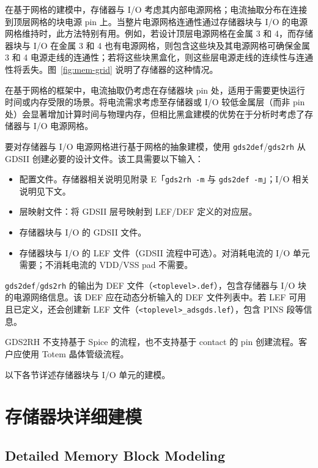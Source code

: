 在基于网格的建模中，存储器与 I/O 考虑其内部电源网格；电流抽取分布在连接到顶层网格的块电源 pin 上。当整片电源网格连通性通过存储器块与 I/O 的电源网格维持时，此方法特别有用。例如，若设计顶层电源网格在金属 3 和 4，而存储器块与 I/O 在金属 3 和 4 也有电源网格，则包含这些块及其电源网格可确保金属 3 和 4 电源走线的连通性；若将这些块黑盒化，则这些层电源走线的连续性与连通性将丢失。图~\ref{fig:mem-grid} 说明了存储器的这种情况。


在基于网格的框架中，电流抽取仍考虑在存储器块 pin 处，适用于需要更快运行时间或内存受限的场景。将电流需求考虑至存储器或 I/O 较低金属层（而非 pin 处）会显著增加计算时间与物理内存，但相比黑盒建模的优势在于分析时考虑了存储器与 I/O 电源网格。

要对存储器与 I/O 电源网格进行基于网格的抽象建模，使用 \texttt{gds2def}/\texttt{gds2rh} 从 GDSII 创建必要的设计文件。该工具需要以下输入：
\begin{itemize}
  \item 配置文件。存储器相关说明见附录 E「\texttt{gds2rh -m} 与 \texttt{gds2def -m}」；I/O 相关说明见下文。
  \item 层映射文件：将 GDSII 层号映射到 LEF/DEF 定义的对应层。
  \item 存储器块与 I/O 的 GDSII 文件。
  \item 存储器块与 I/O 的 LEF 文件（GDSII 流程中可选）。对消耗电流的 I/O 单元需要；不消耗电流的 VDD/VSS pad 不需要。
\end{itemize}

\texttt{gds2def}/\texttt{gds2rh} 的输出为 DEF 文件（\texttt{<toplevel>.def}），包含存储器与 I/O 块的电源网络信息。该 DEF 应在动态分析输入的 DEF 文件列表中。若 LEF 可用且已定义，还会创建新 LEF 文件（\texttt{<toplevel>\_adsgds.lef}），包含 PINS 段等信息。

\begin{noteBox}
GDS2RH 不支持基于 Spice 的流程，也不支持基于 contact 的 pin 创建流程。客户应使用 Totem 晶体管级流程。
\end{noteBox}

以下各节详述存储器块与 I/O 单元的建模。

\section{存储器块详细建模}
\subsection*{Detailed Memory Block Modeling}

